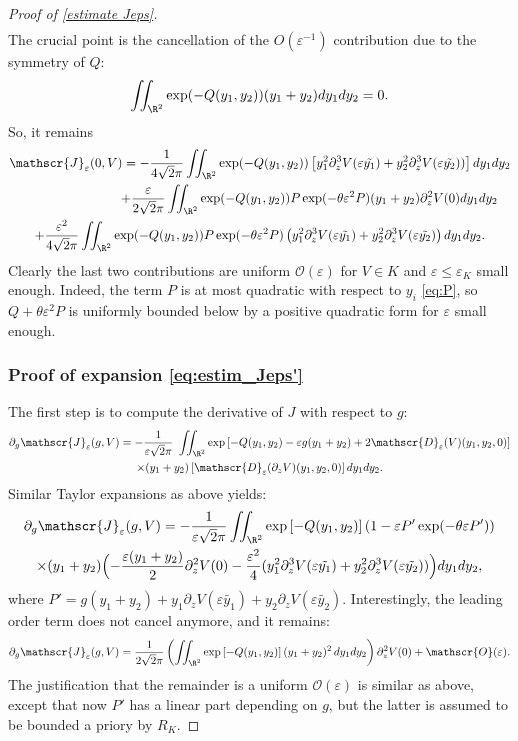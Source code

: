 \documentclass[10pt]{amsart}
\let\mathcal\mathscr
\newcommand{\cO}{\mathcal{O}}
\theoremstyle{plain}
\theoremstyle{definition}
\newcommand{\D}{\mathcal{D}_\eps}
\newcommand{\Je}{\mathcal{J}_\eps}
\let\eps\varepsilon
\newcommand{\RK}{R_K}
\begin{document}
\begin{proof}[Proof of \cref{estimate Jeps}]
\begin{multline*}
\end{multline*}
The crucial point is the cancellation of the $O(\eps^{-1})$ contribution due to the symmetry of $Q$:
\begin{equation}\label{eq:cancellation}
\iint_{\R^2} \exp (-Q(y_1,y_2)) (y_1 + y_2) d y_1 d y_2 = 0.
\end{equation}
So, it remains
\begin{multline*}
\Je(0,V) = - \dfrac{1}{4 \sqrt{2}\pi} \iint _{\R^2} \exp(-Q (y_1,y_2)) \left[ y_1^2 \partial_z^3 V(\eps \tilde{y_1}) + y_2^2 \partial_z^3 V(\eps \tilde{y_2})) \right] dy_1dy_2 \\
\shoveright{+ \frac\eps{2 \sqrt{2}\pi} \iint _{\R^2} \exp(-Q (y_1,y_2)) P \exp(-\theta \eps^2 P) (y_1+y_2) \partial_z^2 V(0) dy_1dy_2} \\
+ \frac{\eps^2}{4\sqrt{2}\pi} \iint _{\R^2} \exp(-Q (y_1,y_2)) P \exp(-\theta \eps^2 P) \left (y_1^2 \partial_z^3 V(\eps \tilde{y_1}) + y_2^2 \partial_z^3 V(\eps \tilde{y_2}) \right) dy_1dy_2.
\end{multline*}
Clearly the last two contributions are uniform $\cO(\eps)$ for $V\in K$ and $\eps \leq \eps_K$ small enough. Indeed, the term $P$ is at most quadratic with respect to $y_i$ \eqref{eq:P}, so $Q + \theta\eps^2 P$ is uniformly bounded below by a positive quadratic form for $\eps$ small enough.

\subsubsection*{Proof of expansion \eqref{eq:estim_Jeps'}}
The first step is to compute the derivative of $J$ with respect to $g$:
\begin{multline*}
\partial_g \Je(g,V) = -\frac{1}{\eps \sqrt{2}\pi} \ \iint_{\R^2} \exp\left[-Q(y_1,y_2) - \eps g (y_1+y_2) + 2 \D(V)(y_1,y_2,0) \right]\\
\times (y_1+y_2) \left[\D(\partial_z V)(y_1,y_2,0) \right] d y_1 d y_2.
\end{multline*}
Similar Taylor expansions as above yields:
\begin{multline*}
\partial_g \Je(g,V) = -\frac{1}{\eps \sqrt{2}\pi} \iint_{\R^2} \exp\left[-Q(y_1,y_2)\right ] \left (1 - \eps P' \exp(-\theta\eps P') \right) \\ \times
(y_1+y_2) \Bigl(- \dfrac{\eps (y_1+y_2)}{2} \partial_z^2 V(0)- \dfrac{\eps^2}{4} (y_1^2 \partial_z^3 V(\eps \tilde{y_1}) + y_2^2 \partial_z^3 V(\eps \tilde{y_2})) \Bigr) d y_1 d y_2,
\end{multline*}
where $P' = g(y_1 + y_2) + y_1 \partial_z V(\eps \tilde{y_1}) + y_2 \partial_z V(\eps \tilde{y_2})$. Interestingly, the leading order term does not cancel anymore, and it remains:
\begin{equation*}
\partial_g \Je(g,V) = \frac{1}{2 \sqrt{2}\pi} \left (\iint_{\R^2} \exp\left[-Q(y_1,y_2)\right ](y_1+y_2)^2 \, dy_1dy_2\right) \partial_z^2 V(0) + \cO(\eps).
\end{equation*}
The justification that the remainder is a uniform $\cO(\eps)$ is similar as above, except that now $P'$ has a linear part depending on $g$, but the latter is assumed to be bounded a priory by $\RK$.
\end{proof}
\end{document}
